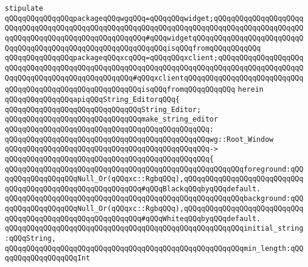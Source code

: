 \newline
\verb|stipulate|\newline
\verb|qQQqqQQqqQQqqQQqpackageqQQqwgqQQq=qQQqqQQqwidget;qQQqqQQqqQQqqQQqqQQqqQQqqQQqqQQqqQQqqQQqqQQqqQQqqQQqqQQqqQQqqQQqqQQqqQQqqQQqqQQqqQQqqQQqqQQqqQQqqQQqqQQqqQQqqQQqqQQqqQQqqQQq#qQQqwidgetqQQqqQQqqQQqqQQqqQQqqQQqqQQqqQQqqQQqqQQqqQQqqQQqqQQqqQQqqQQqqQQqisqQQqfromqQQqqQQqqQQq|\newline
\verb|qQQqqQQqqQQqqQQqpackageqQQqxcqQQq=qQQqqQQqxclient;qQQqqQQqqQQqqQQqqQQqqQQqqQQqqQQqqQQqqQQqqQQqqQQqqQQqqQQqqQQqqQQqqQQqqQQqqQQqqQQqqQQqqQQqqQQqqQQqqQQqqQQqqQQqqQQqqQQqqQQq#qQQqxclientqQQqqQQqqQQqqQQqqQQqqQQqqQQqqQQqqQQqqQQqqQQqqQQqqQQqqQQqqQQqisqQQqfromqQQqqQQqqQQq|\newline
\verb|herein|\newline
\newline
\verb|qQQqqQQqqQQqqQQqapiqQQqString_EditorqQQq{|\newline
\newline
\verb|qQQqqQQqqQQqqQQqqQQqqQQqqQQqqQQqString_Editor;|\newline
\newline
\verb|qQQqqQQqqQQqqQQqqQQqqQQqqQQqqQQqmake_string_editor|\newline
\verb|qQQqqQQqqQQqqQQqqQQqqQQqqQQqqQQqqQQqqQQqqQQqqQQq:|\newline
\verb|qQQqqQQqqQQqqQQqqQQqqQQqqQQqqQQqqQQqqQQqqQQqqQQqwg::Root_Window|\newline
\verb|qQQqqQQqqQQqqQQqqQQqqQQqqQQqqQQqqQQqqQQqqQQqqQQq->|\newline
\verb|qQQqqQQqqQQqqQQqqQQqqQQqqQQqqQQqqQQqqQQqqQQqqQQq{|\newline
\verb|qQQqqQQqqQQqqQQqqQQqqQQqqQQqqQQqqQQqqQQqqQQqqQQqqQQqqQQqforeground:qQQqqQQqqQQqqQQqqQQqNull_Or(qQQqxc::RgbqQQq),qQQqqQQqqQQqqQQqqQQqqQQqqQQqqQQqqQQqqQQqqQQqqQQqqQQqqQQqqQQq#qQQqBlackqQQqbyqQQqdefault.|\newline
\verb|qQQqqQQqqQQqqQQqqQQqqQQqqQQqqQQqqQQqqQQqqQQqqQQqqQQqqQQqbackground:qQQqqQQqqQQqqQQqqQQqNull_Or(qQQqxc::RgbqQQq),qQQqqQQqqQQqqQQqqQQqqQQqqQQqqQQqqQQqqQQqqQQqqQQqqQQqqQQqqQQq#qQQqWhiteqQQqbyqQQqdefault.|\newline
\verb|qQQqqQQqqQQqqQQqqQQqqQQqqQQqqQQqqQQqqQQqqQQqqQQqqQQqqQQqinitial_string:qQQqString,|\newline
\verb|qQQqqQQqqQQqqQQqqQQqqQQqqQQqqQQqqQQqqQQqqQQqqQQqqQQqqQQqmin_length:qQQqqQQqqQQqqQQqqQQqInt|\newline
